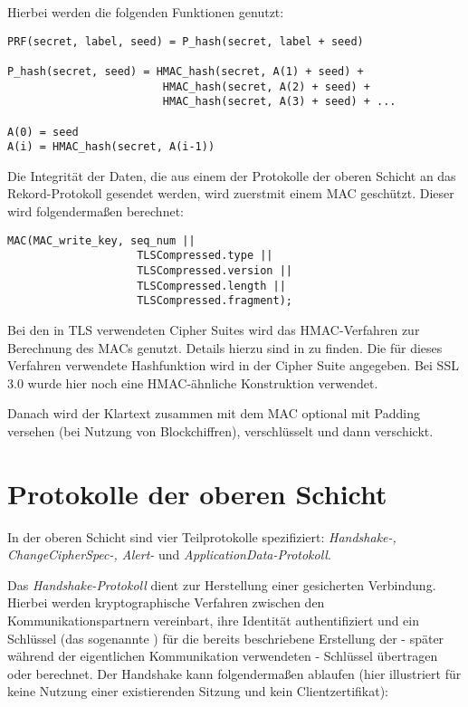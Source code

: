 Hierbei werden die folgenden Funktionen genutzt:

\begin{lstlisting}
PRF(secret, label, seed) = P_hash(secret, label + seed)

P_hash(secret, seed) = HMAC_hash(secret, A(1) + seed) +
						HMAC_hash(secret, A(2) + seed) +
						HMAC_hash(secret, A(3) + seed) + ...

A(0) = seed
A(i) = HMAC_hash(secret, A(i-1))
\end{lstlisting}

Die Integrität der Daten, die aus einem der Protokolle der oberen Schicht an das Rekord-Protokoll gesendet werden, wird zuerstmit einem MAC geschützt. Dieser wird folgendermaßen berechnet:
\begin{lstlisting}
MAC(MAC_write_key, seq_num ||
					TLSCompressed.type ||
					TLSCompressed.version ||
					TLSCompressed.length ||
					TLSCompressed.fragment);
\end{lstlisting}
Bei den in TLS verwendeten Cipher Suites wird das HMAC-Verfahren zur Berechnung des MACs genutzt. Details hierzu sind in \cite{hmac97} zu finden. Die für dieses Verfahren verwendete Hashfunktion wird in der Cipher Suite angegeben. Bei SSL 3.0 wurde hier noch eine HMAC-ähnliche Konstruktion verwendet.

Danach wird der Klartext zusammen mit dem MAC optional mit Padding versehen (bei Nutzung von Blockchiffren), verschlüsselt und dann verschickt.


\section{Protokolle der oberen Schicht}

In der oberen Schicht sind vier Teilprotokolle spezifiziert: \emph{Handshake-, ChangeCipherSpec-, Alert-} und \emph{ApplicationData-Protokoll}.

Das \emph{Handshake-Protokoll} dient zur Herstellung einer gesicherten Verbindung. Hierbei werden kryptographische Verfahren zwischen den Kommunikationspartnern vereinbart, ihre Identität authentifiziert und ein Schlüssel (das sogenannte \premastersecret{}) für die bereits beschriebene Erstellung der - später während der eigentlichen Kommunikation verwendeten - Schlüssel übertragen oder berechnet. Der Handshake kann folgendermaßen ablaufen (hier illustriert für keine Nutzung einer existierenden Sitzung und kein Clientzertifikat): 


